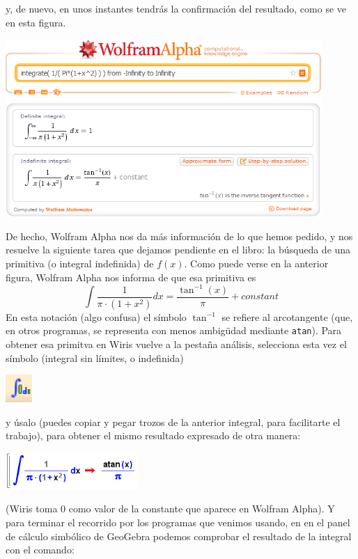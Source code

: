 \documentclass[10pt,a4paper]{article}\usepackage[]{graphicx}\usepackage[]{color}
\begin{document}
y, de nuevo, en unos instantes tendrás la confirmación del resultado, como se ve en esta figura.
\begin{center}
    \includegraphics[width=12cm]{../fig/Tut05-15.png}
\end{center}
De hecho, Wolfram Alpha nos da más información de lo que hemos pedido, y nos resuelve la siguiente tarea que dejamos pendiente en el libro: la búsqueda de una primitiva (o integral indefinida) de $f(x)$. Como puede verse en la anterior figura, Wolfram Alpha nos informa de que esa primitiva es
    \[\int\dfrac{1}{\pi\cdot(1+x^2)} dx = \dfrac{\tan^{-1}(x)}{\pi}+constant\]
En esta notación (algo confusa) el símbolo $\tan^{-1}$ se refiere al arcotangente (que, en otros programas, se representa con menos ambigüdad mediante {\tt atan}). Para obtener esa primitva en Wiris vuelve a la pestaña análisis, selecciona esta vez el símbolo (integral sin límites, o indefinida)
\begin{center}
    \includegraphics[width=1cm]{../fig/Tut05-16.png}
\end{center}
y úsalo (puedes copiar y pegar trozos de la anterior integral, para facilitarte el trabajo), para obtener el mismo resultado expresado de otra manera:
\begin{center}
    \includegraphics[width=5cm]{../fig/Tut05-17.png}
\end{center}
(Wiris toma 0 como valor de la constante que aparece en Wolfram Alpha). Y para terminar el recorrido por los programas que venimos usando, en en el panel de cálculo simbólico de GeoGebra podemos comprobar el resultado de la integral con el comando:
\end{document}
